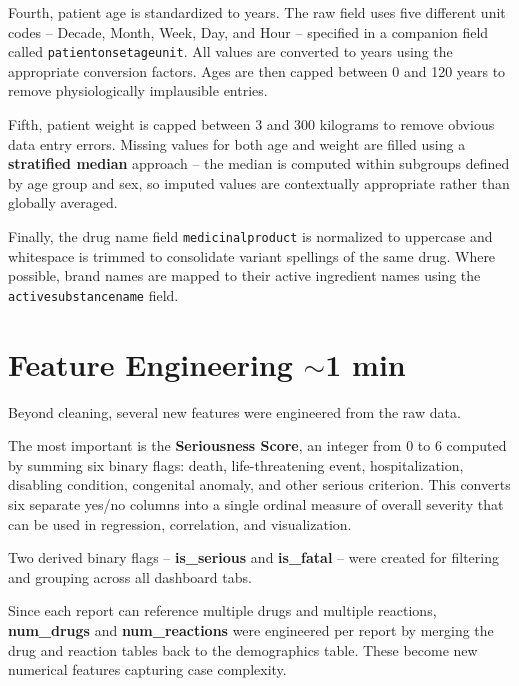 \documentclass[12pt, letterpaper]{article}
\begin{document}
Fourth, patient age is standardized to years. The raw field uses five different
unit codes -- Decade, Month, Week, Day, and Hour -- specified in a companion
field called \texttt{patientonsetageunit}. All values are converted to years
using the appropriate conversion factors. Ages are then capped between 0 and 120
years to remove physiologically implausible entries.

Fifth, patient weight is capped between 3 and 300 kilograms to remove obvious
data entry errors. Missing values for both age and weight are filled using a
\textbf{stratified median} approach -- the median is computed within subgroups
defined by age group and sex, so imputed values are contextually appropriate
rather than globally averaged.

Finally, the drug name field \texttt{medicinalproduct} is normalized to
uppercase and whitespace is trimmed to consolidate variant spellings of the same
drug. Where possible, brand names are mapped to their active ingredient names
using the \texttt{activesubstancename} field.

\section{Feature Engineering \hfill \textcolor{slidenumber}{\small $\sim$1 min}}

Beyond cleaning, several new features were engineered from the raw data.

The most important is the \textbf{Seriousness Score}, an integer from 0 to 6
computed by summing six binary flags: death, life-threatening event,
hospitalization, disabling condition, congenital anomaly, and other serious
criterion. This converts six separate yes/no columns into a single ordinal
measure of overall severity that can be used in regression, correlation, and
visualization.

Two derived binary flags -- \textbf{is\_serious} and \textbf{is\_fatal} -- were
created for filtering and grouping across all dashboard tabs.

Since each report can reference multiple drugs and multiple reactions,
\textbf{num\_drugs} and \textbf{num\_reactions} were engineered per report by
merging the drug and reaction tables back to the demographics table. These
become new numerical features capturing case complexity.
\end{document}
